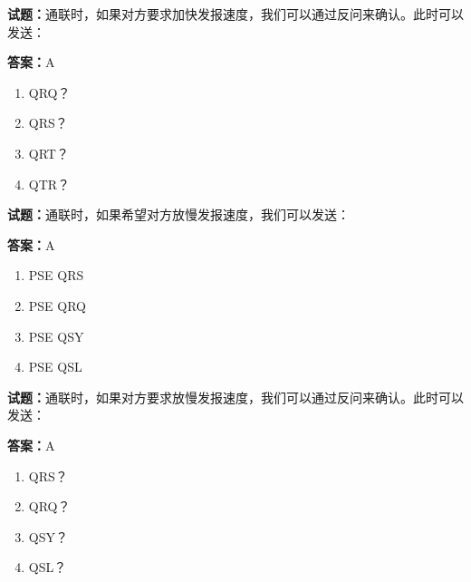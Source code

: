 \documentclass{ctexbook}
\begin{document}




\vspace{1em}

\textbf{试题：}通联时，如果对方要求加快发报速度，我们可以通过反问来确认。此时可以发送： 

\textbf{答案：}A 

\begin{enumerate}[leftmargin=3em]
  \item QRQ？ 

  \item QRS？ 

  \item QRT？ 

  \item QTR？ 

\end{enumerate}





\vspace{1em}

\textbf{试题：}通联时，如果希望对方放慢发报速度，我们可以发送： 

\textbf{答案：}A 

\begin{enumerate}[leftmargin=3em]
  \item PSE QRS 

  \item PSE QRQ 

  \item PSE QSY 

  \item PSE QSL 

\end{enumerate}





\vspace{1em}

\textbf{试题：}通联时，如果对方要求放慢发报速度，我们可以通过反问来确认。此时可以发送： 

\textbf{答案：}A 


\begin{enumerate}[leftmargin=3em]
  \item QRS？ 

  \item QRQ？ 

  \item QSY？ 

  \item QSL？ 

\end{enumerate}
\end{document}
